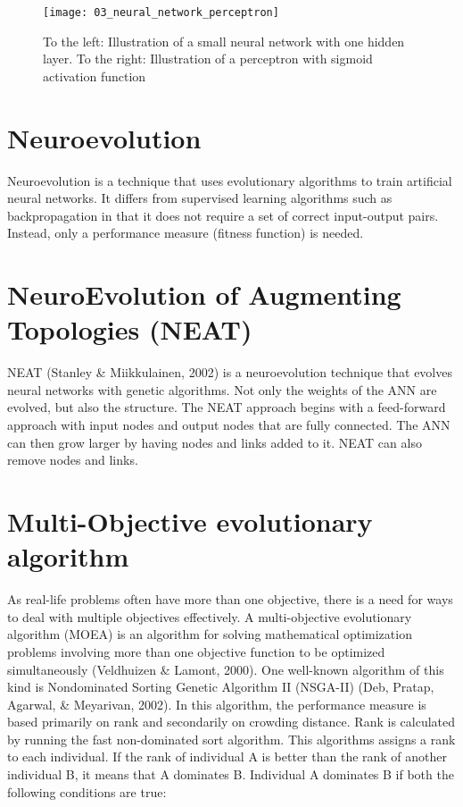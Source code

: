 \begin{figure}[h]
    \centering
    \texttt{[image: 03\_neural\_network\_perceptron]}
    \caption{To the left: Illustration of a small neural network with one hidden layer. To the right: Illustration of a perceptron with sigmoid activation function}
    \label{fig:neural_network_perceptron}
\end{figure}

\section{Neuroevolution}
Neuroevolution is a technique that uses evolutionary algorithms to train artificial neural networks. It differs from supervised learning algorithms such as backpropagation in that it does not require a set of correct input-output pairs. Instead, only a performance measure (fitness function) is needed.

\section{NeuroEvolution of Augmenting Topologies (NEAT)}
NEAT (Stanley \& Miikkulainen, 2002) is a neuroevolution technique that evolves neural networks with genetic algorithms. Not only the weights of the ANN are evolved, but also the structure. The NEAT approach begins with a feed-forward approach with input nodes and output nodes that are fully connected. The ANN can then grow larger by having nodes and links added to it. NEAT can also remove nodes and links.

\section{Multi-Objective evolutionary algorithm}
As real-life problems often have more than one objective, there is a need for ways to deal with multiple objectives effectively. A multi-objective evolutionary algorithm (MOEA) is an algorithm for solving mathematical optimization problems involving more than one objective function to be optimized simultaneously (Veldhuizen \& Lamont, 2000). One well-known algorithm of this kind is Nondominated Sorting Genetic Algorithm II (NSGA-II) (Deb, Pratap, Agarwal, \& Meyarivan, 2002). In this algorithm, the performance measure is based primarily on rank and secondarily on crowding distance. Rank is calculated by running the fast non-dominated sort algorithm. This algorithms assigns a rank to each individual. If the rank of individual A is better than the rank of another individual B, it means that A dominates B. Individual A dominates B if both the following conditions are true:

